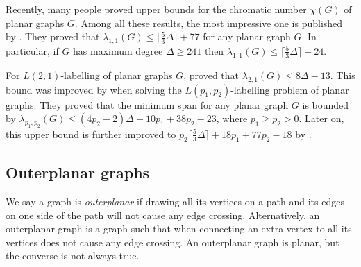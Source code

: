 Recently, many people proved upper bounds for the chromatic number $\chi(G)$ of planar graphs $G$. Among all these results, the most impressive one is published by \cite{molloy05}. They proved that $\lambda_{1,1}(G) \le \lceil \frac{5}{3}\Delta \rceil + 77$ for any planar graph $G$. In particular, if $G$ has maximum degree $\Delta \ge 241$ then $\lambda_{1,1}(G) \le \lceil \frac{5}{3}\Delta \rceil + 24$. 

For $L(2,1)$-labelling of planar graphs $G$, \cite{jonas93} proved that $\lambda_{2,1}(G) \le 8\Delta - 13$. This bound was improved by \cite{van03} when solving the $L(p_1,p_2)$-labelling problem of planar graphs. They proved that the minimum span for any planar graph $G$ is bounded by $\lambda_{p_1,p_2}(G) \le (4p_2-2)\Delta + 10p_1+38p_2-23$, where $p_1 \ge p_2 > 0$. Later on, this upper bound is further improved to $p_2\lceil \frac{5}{3} \Delta \rceil + 18p_1+77p_2-18$ by \cite{molloy05}.


\subsection{Outerplanar graphs} 
\label{linear outerplanar}
We say a graph is \emph{outerplanar} if drawing all its vertices on a path and its edges on one side of the path will not cause any edge crossing. Alternatively, an outerplanar graph is a graph such that when connecting an extra vertex to all its vertices does not cause any edge crossing. An outerplanar graph is planar, but the converse is not always true. 


